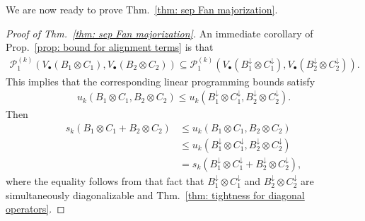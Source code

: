 \documentclass[12pt]{article}
\theoremstyle{definition}
\numberwithin{equation}{section}
\numberwithin{equation}{section}
\newcommand{\da}{\downarrow}
\newcommand{\cP}{\mathcal{P}}
\begin{document}
We are now ready to prove Thm.~\ref{thm: sep Fan majorization}. 
\begin{proof} [Proof of Thm.~\ref{thm: sep Fan majorization}]
An immediate corollary of Prop.~\ref{prop: bound for alignment terms} is that 
\begin{gather}\cP_1^{(k)} (V_{\bullet} (B_1 \otimes C_1), V_{\bullet}(B_2 \otimes C_2)) \subseteq \cP_1^{(k)} (V_{\bullet} (B_1^{\da} \otimes C_1^{\da}), V_{\bullet} (B_2^{\da} \otimes C_2^{\da})).
\end{gather}
This implies that the corresponding linear programming bounds satisfy 
\begin{gather}
    u_k (B_1 \otimes C_1, B_2 \otimes C_2) \leq u_k (B_1^\da \otimes C_1^\da, B_2^\da \otimes C_2^\da).
\end{gather}
Then
\begin{align}
    s_k (B_1 \otimes C_1 + B_2 \otimes C_2) &\leq u_k (B_1 \otimes C_1, B_2 \otimes C_2) \\
    &\leq u_k (B_1^\da \otimes C_1^\da, B_2^\da \otimes C_2^\da) \\
    &= s_k (B_1^\da \otimes C_1^\da + B_2^\da \otimes C_2^\da),
\end{align}
where the equality follows from that fact that \(B_1^\da \otimes C_1^\da\) and \(B_2^\da \otimes C_2^\da\) are simultaneously diagonalizable and Thm.~\ref{thm: tightness for diagonal operators}.
\end{proof}
\end{document}
